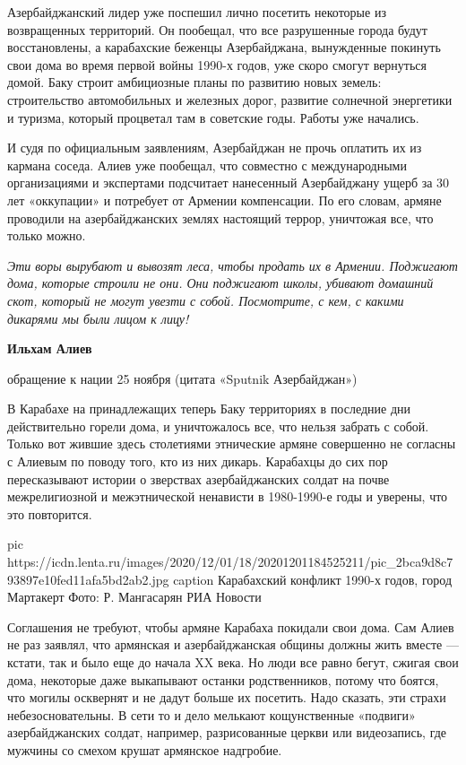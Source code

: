 Азербайджанский лидер уже поспешил лично посетить некоторые из возвращенных
территорий. Он пообещал, что все разрушенные города будут восстановлены, а
карабахские беженцы Азербайджана, вынужденные покинуть свои дома во время
первой войны 1990-х годов, уже скоро смогут вернуться домой. Баку строит
амбициозные планы по развитию новых земель: строительство автомобильных и
железных дорог, развитие солнечной энергетики и туризма, который процветал там
в советские годы. Работы уже начались.

И судя по официальным заявлениям, Азербайджан не прочь оплатить их из кармана
соседа. Алиев уже пообещал, что совместно с международными организациями и
экспертами подсчитает нанесенный Азербайджану ущерб за 30 лет «оккупации» и
потребует от Армении компенсации. По его словам, армяне проводили на
азербайджанских землях настоящий террор, уничтожая все, что только можно.

\begin{leftbar}
\emph{Эти воры вырубают и вывозят леса, чтобы продать их в Армении. Поджигают дома,
которые строили не они. Они поджигают школы, убивают домашний скот,
который не могут увезти с собой. Посмотрите, с кем, с какими дикарями
мы были лицом к лицу!}\par
\textbf{Ильхам Алиев}\par
обращение к нации 25 ноября (цитата «Sputnik Азербайджан»)	
\end{leftbar}

В Карабахе на принадлежащих теперь Баку территориях в последние дни
действительно горели дома, и уничтожалось все, что нельзя забрать с собой.
Только вот жившие здесь столетиями этнические армяне совершенно не согласны с
Алиевым по поводу того, кто из них дикарь. Карабахцы до сих пор пересказывают
истории о зверствах азербайджанских солдат на почве межрелигиозной и
межэтнической ненависти в 1980-1990-е годы и уверены, что это повторится.

\ifcmt
pic https://icdn.lenta.ru/images/2020/12/01/18/20201201184525211/pic_2bca9d8c793897e10fed11afa5bd2ab2.jpg
caption Карабахский конфликт 1990-х годов, город Мартакерт Фото: Р. Мангасарян РИА Новости
\fi

Соглашения не требуют, чтобы армяне Карабаха покидали свои дома. Сам Алиев не
раз заявлял, что армянская и азербайджанская общины должны жить вместе —
кстати, так и было еще до начала XX века. Но люди все равно бегут, сжигая свои
дома, некоторые даже выкапывают останки родственников, потому что боятся, что
могилы осквернят и не дадут больше их посетить. Надо сказать, эти страхи
небезосновательны. В сети то и дело мелькают кощунственные «подвиги»
азербайджанских солдат, например, разрисованные церкви или видеозапись, где
мужчины со смехом крушат армянское надгробие.

